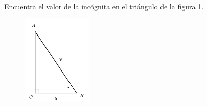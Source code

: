 \question[15]  Encuentra el valor de la incógnita en el triángulo de la figura \ref{fig:angle_functrig_15}.
\begin{figure}[H]
    \begin{center}
        \includegraphics[width=0.3\textwidth]{../images/angle_functrig_15.png}
    \end{center}
    \caption{}
    \label{fig:angle_functrig_15}
\end{figure}